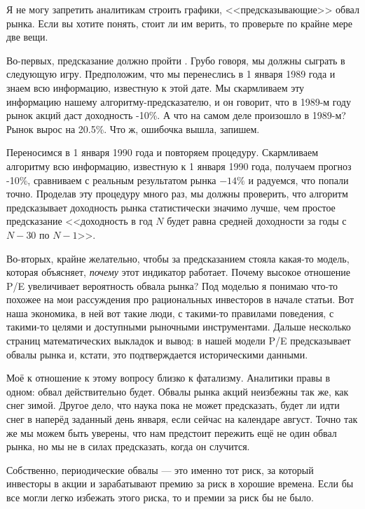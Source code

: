 Я не могу запретить аналитикам строить графики, <<предсказывающие>> обвал рынка. 
Если вы хотите понять, стоит ли им верить, то проверьте по крайне мере две вещи.

Во-первых, предсказание должно пройти  . Грубо говоря, мы должны сыграть в следующую игру. 
Предположим, что мы перенеслись в 1 января 1989 года и знаем всю 
информацию, известную к этой дате. Мы скармливаем эту информацию нашему 
алгоритму-предсказателю, и он говорит, что в 1989-м году рынок акций даст 
доходность -10\%. А что на самом деле произошло в 1989-м? Рынок вырос на 20.5\%. 
Что ж, ошибочка вышла, запишем.

Переносимся в 1 января 1990 года и повторяем процедуру. Скармливаем 
алгоритму всю информацию, известную к 1 января 1990 года, получаем прогноз 
-10\%, сравниваем с реальным результатом рынка $-14\%$ и радуемся, что попали 
точно. Проделав эту процедуру много раз, мы должны проверить, что алгоритм 
предсказывает доходность рынка статистически значимо лучше, чем простое 
предсказание <<доходность в год $N$ будет равна средней доходности за годы с 
$N-30$ по $N-1$>>.

Во-вторых, крайне желательно, чтобы за предсказанием стояла ка\-кая-то модель, 
которая объясняет, \emph{почему} этот индикатор работает. Почему высокое 
отношение P/E увеличивает вероятность обвала рынка? Под моделью я понимаю что-то 
похожее на мои рассуждения про рациональных инвесторов в начале статьи. Вот наша 
экономика, в ней вот такие люди, с такими-то правилами поведения, с такими-то 
целями и доступными рыночными инструментами. Дальше несколько страниц 
математических выкладок и вывод: в нашей модели P/E предсказывает обвалы рынка 
и, кстати, это подтверждается историческими данными.

Моё к отношение к этому вопросу близко к фатализму. Аналитики правы в одном: 
обвал действительно будет. Обвалы рынка акций неизбежны так же, как снег зимой. 
Другое дело, что наука пока не может предсказать, будет ли идти снег в наперёд 
заданный день января, если сейчас на календаре август. Точно так же мы можем 
быть уверены, что нам предстоит пережить ещё не один обвал рынка, но мы не в 
силах предсказать, когда он случится.

Собственно, периодические обвалы --- это именно тот риск, за который инвесторы в 
акции и зарабатывают премию за риск в хорошие времена. Если бы все могли легко 
избежать этого риска, то и премии за риск бы не было.


